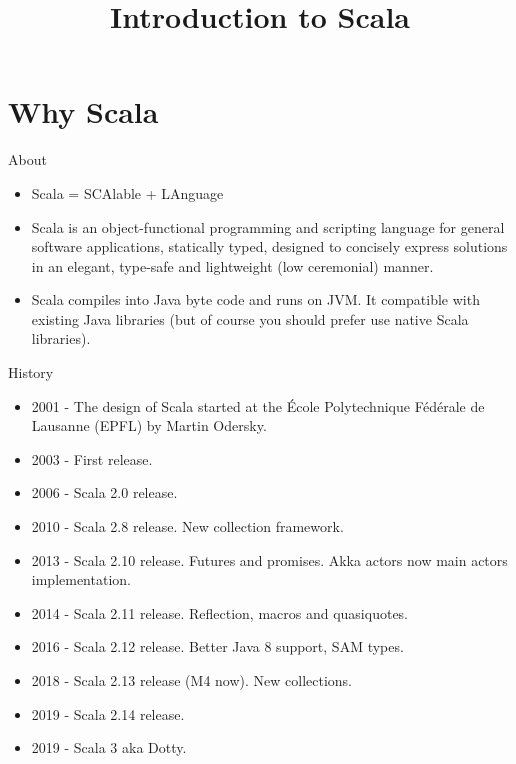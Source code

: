 

\usepackage{tikz}
\usepackage{tikz-uml}

\title{Introduction to Scala}



\begin{frame}
    \titlepage
\end{frame}

\section{Why Scala}

\begin{frame}{About}

\begin{itemize}
  \item Scala = SCAlable + LAnguage

  \item Scala is an object-functional programming and scripting language for general software applications, statically typed, designed to concisely express solutions in an elegant, type-safe and lightweight (low ceremonial) manner.

  \item Scala compiles into Java byte code and runs on JVM. It compatible with existing Java libraries (but of course you should prefer use native Scala libraries).
\end{itemize}

\end{frame}

\begin{frame}{History}

\begin{itemize}[<+->]
  \item 2001 - The design of Scala started at the École Polytechnique Fédérale de Lausanne (EPFL) by Martin Odersky.
  \item 2003 - First release.
  \item 2006 - Scala 2.0 release.
  \item 2010 - Scala 2.8 release. New collection framework.
  \item 2013 - Scala 2.10 release. Futures and promises. Akka actors now main actors implementation.
  \item 2014 - Scala 2.11 release. Reflection, macros and quasiquotes.
  \item 2016 - Scala 2.12 release. Better Java 8 support, SAM types.
  \item 2018 - Scala 2.13 release (M4 now). New collections.
  \item 2019 - Scala 2.14 release.
  \item 2019 - Scala 3 aka Dotty.
\end{itemize}
\end{frame}

